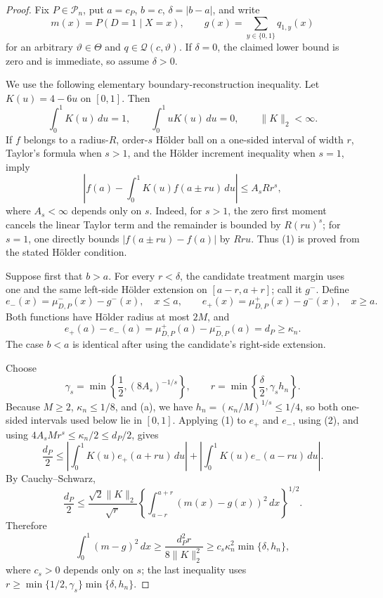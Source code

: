 \documentclass{article}
\begin{document}
\begin{proof}
Fix \(P\in\mathcal P_n\), put \(a=c_P\), \(b=c\), \(\delta=|b-a|\), and write
\[
 m(x)=P(D=1\mid X=x),\qquad
 g(x)=\sum_{y\in\{0,1\}}q_{1,y}(x)
\]
for an arbitrary \(\vartheta\in\Theta\) and \(q\in\mathcal Q(c,\vartheta)\).  If \(\delta=0\), the claimed lower bound is zero and is immediate, so assume \(\delta>0\).

We use the following elementary boundary-reconstruction inequality.  Let \(K(u)=4-6u\) on \([0,1]\).  Then
\[
 \int_0^1K(u)\,du=1,
 \qquad
 \int_0^1uK(u)\,du=0,
 \qquad
 \|K\|_2<\infty.
\]
If \(f\) belongs to a radius-\(R\), order-\(s\) H\"older ball on a one-sided interval of width \(r\), Taylor's formula when \(s>1\), and the H\"older increment inequality when \(s=1\), imply
\[
 \left|f(a)-\int_0^1K(u)f(a\mathbin{\pm}ru)\,du\right|
 \le A_s Rr^s,                                                    \tag{1}
\]
where \(A_s<\infty\) depends only on \(s\).  Indeed, for \(s>1\), the zero first moment cancels the linear Taylor term and the remainder is bounded by \(R(ru)^s\); for \(s=1\), one directly bounds \(|f(a\mathbin{\pm}ru)-f(a)|\) by \(Rru\).  Thus (1) is proved from the stated H\"older condition.

Suppose first that \(b>a\).  For every \(r<\delta\), the candidate treatment margin uses one and the same left-side H\"older extension on \([a-r,a+r]\); call it \(g^-\).  Define
\[
 e_-(x)=\mu_{D,P}^-(x)-g^-(x),\quad x\le a,
 \qquad
 e_+(x)=\mu_{D,P}^+(x)-g^-(x),\quad x\ge a.
\]
Both functions have H\"older radius at most \(2M\), and
\[
 e_+(a)-e_-(a)=\mu_{D,P}^+(a)-\mu_{D,P}^-(a)=d_P\ge\kappa_n.       \tag{2}
\]
The case \(b<a\) is identical after using the candidate's right-side extension.

Choose
\[
 \gamma_s=\min\left\{\frac12,(8A_s)^{-1/s}\right\},
 \qquad
 r=\min\left\{\frac{\delta}{2},\gamma_sh_n\right\}.
\]
Because \(M\ge2\), \(\kappa_n\le1/8\), and (a\in[1/4,3/4]), we have \(h_n=(\kappa_n/M)^{1/s}\le1/4\), so both one-sided intervals used below lie in \([0,1]\).  Applying (1) to \(e_+\) and \(e_-\), using (2), and using \(4A_sMr^s\le\kappa_n/2\le d_P/2\), gives
\[
 \frac{d_P}{2}
 \le \left|\int_0^1K(u)e_+(a+ru)\,du\right|
    +\left|\int_0^1K(u)e_-(a-ru)\,du\right|.
\]
By Cauchy--Schwarz,
\[
 \frac{d_P}{2}
 \le \frac{\sqrt2\|K\|_2}{\sqrt r}
 \left\{\int_{a-r}^{a+r}(m(x)-g(x))^2\,dx\right\}^{1/2}.
\]
Therefore
\[
 \int_0^1(m-g)^2\,dx
 \ge \frac{d_P^2r}{8\|K\|_2^2}
 \ge c_s\kappa_n^2\min\{\delta,h_n\},                           \tag{3}
\]
where \(c_s>0\) depends only on \(s\); the last inequality uses
\(r\ge\min\{1/2,\gamma_s\}\min\{\delta,h_n\}\).


\end{proof}
\end{document}
